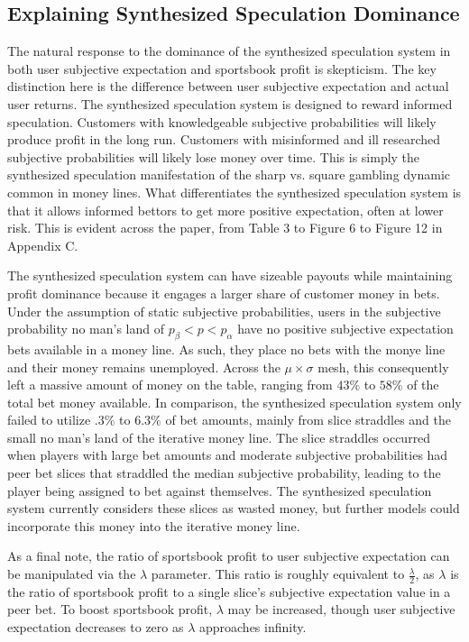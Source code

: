 \documentclass[sn-mathphys-num]{sn-jnl}
\theoremstyle{thmstyleone}%
\theoremstyle{thmstyletwo}%
\theoremstyle{thmstylethree}%
\begin{document}
\subsection{Explaining Synthesized Speculation Dominance}

The natural response to the dominance of the synthesized speculation system in both user subjective expectation and sportsbook profit is skepticism. The key distinction here is the difference between user subjective expectation and actual user returns. The synthesized speculation system is designed to reward informed speculation. Customers with knowledgeable subjective probabilities will likely produce profit in the long run. Customers with misinformed and ill researched subjective probabilities will likely lose money over time. This is simply the synthesized speculation manifestation of the sharp vs. square gambling dynamic common in money lines. What differentiates the synthesized speculation system is that it allows informed bettors to get more positive expectation, often at lower risk. This is evident across the paper, from Table 3 to Figure 6 to Figure 12 in Appendix C. 

The synthesized speculation system can have sizeable payouts while maintaining profit dominance because it engages a larger share of customer money in bets. Under the assumption of static subjective probabilities, users in the subjective probability no man's land of $p_\beta < p < p_\alpha$ have no positive subjective expectation bets available in a money line. As such, they place no bets with the monye line and their money remains unemployed. Across the $\mu \times \sigma$ mesh, this consequently left a massive amount of money on the table, ranging from $43\%$ to $58\%$ of the total bet money available. In comparison, the synthesized speculation system only failed to utilize $.3\%$ to $6.3\%$ of bet amounts, mainly from slice straddles and the small no man's land of the iterative money line. The slice straddles occurred when players with large bet amounts and moderate subjective probabilities had peer bet slices that straddled the median subjective probability, leading to the player being assigned to bet against themselves. The synthesized speculation system currently considers these slices as wasted money, but further models could incorporate this money into the iterative money line. 

As a final note, the ratio of sportsbook profit to user subjective expectation can be manipulated via the $\lambda$ parameter. This ratio is roughly equivalent to $\frac{\lambda}{2}$, as $\lambda$ is the ratio of sportsbook profit to a single slice's subjective expectation value in a peer bet. To boost sportsbook profit, $\lambda$ may be increased, though user subjective expectation decreases to zero as $\lambda$ approaches infinity. 
\end{document}
